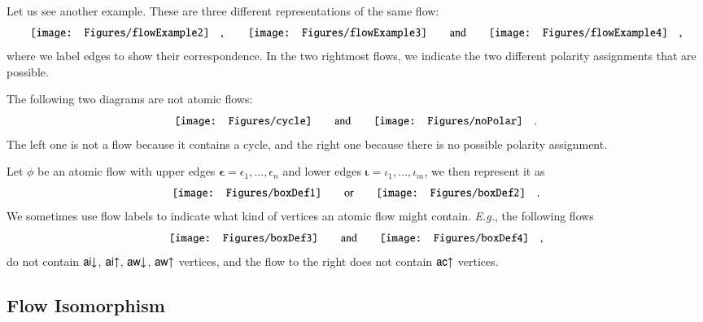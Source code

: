\newcommand{\four}{{\mathchoice{\scriptstyle      \mathbf4}
                                {\scriptstyle      \mathbf4}
                                {\scriptstyle      \mathbf4}
                                {\scriptscriptstyle\mathbf4}}}
\newcommand{\five }{{\mathchoice{\scriptstyle\mathbf5}
                                {\scriptstyle\mathbf5}
                                {\scriptstyle\mathbf5}
                                {\scriptscriptstyle\mathbf5}}}


Let us see another example. These are three different representations of the same flow:
\[
\vcenter{\hbox{\texttt{[image: Figures/flowExample2]}}}
\quad,\qquad
\vcenter{\hbox{\texttt{[image: Figures/flowExample3]}}}
\qquad\hbox{and}\qquad
\vcenter{\hbox{\texttt{[image: Figures/flowExample4]}}}
\quad,
\]
where we label edges to show their correspondence. In the two rightmost flows, we indicate the two different polarity assignments that are possible.

The following two diagrams are not atomic flows:
\[
\vcenter{\hbox{\texttt{[image: Figures/cycle]}}}
\qquad\mbox{and}\qquad
\vcenter{\hbox{\texttt{[image: Figures/noPolar]}}}
\quad.
\]
The left one is not a flow because it contains a cycle, and the right one because there is no possible polarity assignment.

\begin{notation}\label{notation:LabelsOnBoxes}
Let $\phi$ be an atomic flow with upper edges $\boldsymbol\epsilon=\epsilon_1,\dots,\epsilon_n$ and lower edges $\boldsymbol\iota=\iota_1,\dots,\iota_m$, we then represent it as
\[
\vcenter{\hbox{\texttt{[image: Figures/boxDef1]}}}
\qquad\mbox{or}\qquad
\vcenter{\hbox{\texttt{[image: Figures/boxDef2]}}}
\quad.
\]
We sometimes use flow labels to indicate what kind of vertices an atomic flow might contain. \emph{E.g.}, the following flows
\[
\vcenter{\hbox{\texttt{[image: Figures/boxDef3]}}}
\qquad\mbox{and}\qquad
\vcenter{\hbox{\texttt{[image: Figures/boxDef4]}}}
\quad,
\]
do not contain ${\mathsf{ai}{\downarrow}}$, ${\mathsf{ai}{\uparrow}}$, ${\mathsf{aw}{\downarrow}}$, ${\mathsf{aw}{\uparrow}}$ vertices, and the flow to the right does not contain ${\mathsf{ac}{\uparrow}}$ vertices.
\end{notation}

\subsection{Flow Isomorphism}\label{section:FlowIsomorphism}

